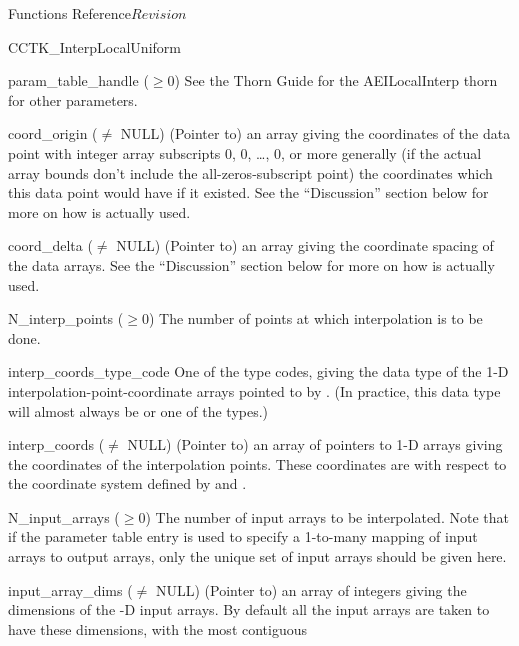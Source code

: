 \begin{cactuspart}{ Functions Reference}{}{$Revision$}
\begin{FunctionDescription}{CCTK\_InterpLocalUniform}
\begin{ParameterSection}
\begin{Parameter}{param\_table\_handle ($\ge 0$)}
See the Thorn Guide for the AEILocalInterp thorn for other parameters.
\end{Parameter}
\begin{Parameter}{coord\_origin ($\ne$ NULL)}
\hbox{}
(Pointer to) an array giving the coordinates of the data point with
integer array subscripts 0, 0, \dots, 0, or more generally (if the actual
array bounds don't include the all-zeros-subscript point) the coordinates
which this data point would have if it existed.  See the ``Discussion''
section below for more on how  is actually used.
\end{Parameter}
\begin{Parameter}{coord\_delta ($\ne$ NULL)}
\hbox{}
(Pointer to) an array giving the coordinate spacing of the data arrays.
See the ``Discussion'' section below for more on how 
is actually used.
\end{Parameter}
\begin{Parameter}{N\_interp\_points ($\ge 0$)}
\hbox{}
The number of points at which interpolation is to be done.
\end{Parameter}
\begin{Parameter}{interp\_coords\_type\_code}
\hbox{}
One of the  type codes, giving the data type
of the 1-D interpolation-point-coordinate arrays pointed to by
.  (In practice, this data type will almost
always be  or one of the  types.)
\end{Parameter}
\begin{Parameter}{interp\_coords ($\ne$ NULL)}
\hbox{}
(Pointer to) an array of  pointers to 1-D arrays giving the
coordinates of the interpolation points.  These coordinates are with
respect to the coordinate system defined by  and
.
\end{Parameter}
\begin{Parameter}{N\_input\_arrays ($\ge 0$)}
\hbox{}
The number of input arrays to be interpolated.
Note that if the parameter table entry 
is used to specify a 1-to-many mapping of input arrays to output arrays,
only the unique set of input arrays should be given here.
\end{Parameter}
\begin{Parameter}{input\_array\_dims ($\ne$ NULL)}
\hbox{}
(Pointer to) an array of  integers giving the dimensions
of the -D input arrays.  By default all the input arrays
are taken to have these dimensions, with \code{[0]} the most contiguous

\end{Parameter}
\end{ParameterSection}
\end{FunctionDescription}
\end{cactuspart}
